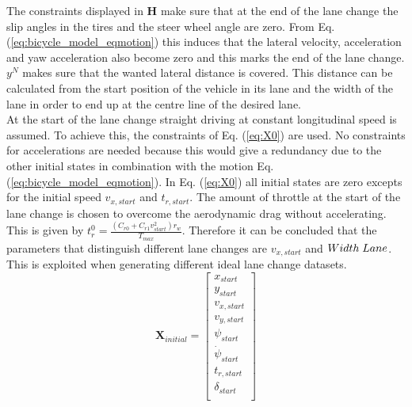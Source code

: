 The constraints displayed in $\bm{H}$ make sure that at the end of the lane change the slip angles in the tires and the steer wheel angle are zero. From Eq. (\ref{eq:bicycle_model_eqmotion}) this induces that the lateral velocity, acceleration and yaw acceleration also become zero and this marks the end of the lane change. $y^N$ makes sure that the wanted lateral distance is covered. This distance can be calculated from the start position of the vehicle in its lane and the width of the lane in order to end up at the centre line of the desired lane. \\ At the start of the lane change straight driving at constant longitudinal speed is assumed. To achieve this, the constraints of Eq. (\ref{eq:X0}) are used. No constraints for accelerations are needed because this would give a redundancy due to the other initial states in combination with the motion Eq. (\ref{eq:bicycle_model_eqmotion}). In Eq. (\ref{eq:X0}) all initial states are zero excepts for the initial speed $v_{x,start}$ and $t_{r,start}$. The amount of throttle at the start of the lane change is chosen to overcome the aerodynamic drag without accelerating. This is given by $t_r^0 = \frac{(C_{r0}+C_{r1}v_{start}^2)r_w}{T_{max}}$. Therefore it can be concluded that the parameters that distinguish different lane changes are $v_{x,start}$ and $Width\hspace{1mm}Lane$. This is exploited when generating different ideal lane change datasets. 
\newpage
\begin{equation}\label{eq:X0}
\bm{X}_{initial} =
\begin{bmatrix}
 x_{start}\\ 
 y_{start}\\
 v_{x,start}\\
 v_{y,start}\\
 \psi_{start}\\
 \dot{\psi}_{start}\\
 t_{r,start}\\
 \delta_{start}\\

\end{bmatrix}
\end{equation}


